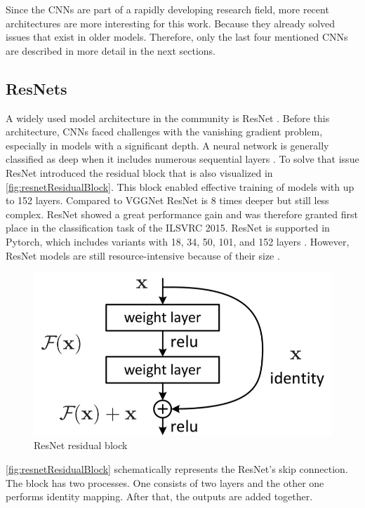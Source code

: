 \vspace{1cm} %

\noindent Since the \ac{CNN}s are part of a rapidly developing research field, more recent architectures are more interesting for this work.
Because they already solved issues that exist in older models.
Therefore, only the last four mentioned \ac{CNN}s are described in more detail in the next sections.

\subsection{ResNets}

A widely used model architecture in the community is ResNet \cite{ResNet}.
Before this architecture, \ac{CNN}s faced challenges with the vanishing gradient problem, especially in models with a significant depth.
A neural network is generally classified as deep when it includes numerous sequential layers \cite{ResNet}.
To solve that issue ResNet introduced the residual block that is also visualized in \autoref{fig:resnetResidualBlock}.
This block enabled effective training of models with up to 152 layers. Compared to VGGNet ResNet is 8 times deeper but still less complex.
ResNet showed a great performance gain and was therefore granted first place in the classification task of the ILSVRC 2015.
ResNet is supported in Pytorch, which includes variants with 18, 34, 50, 101, and 152 layers \cite{pytorchresnet}. 
However, ResNet models are still resource-intensive because of their size \cite{networkArchitectureSurvey}. 

\begin{figure}[H]
    \centering
    \includegraphics[width=0.5\linewidth]{PICs/backbones/resnet_residualBlock.jpg}
    \caption{ResNet residual block \cite{ResNet}}
    \label{fig:resnetResidualBlock}
\end{figure}

\noindent \autoref{fig:resnetResidualBlock} schematically represents the ResNet's skip connection.
The block has two processes.
One consists of two layers and the other one performs identity mapping.
After that, the outputs are added together.

